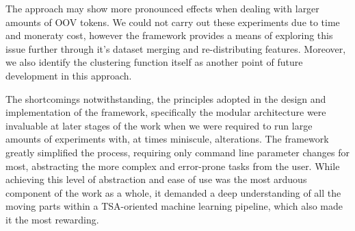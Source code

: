 \documentclass[../../fyp.tex]{subfiles}
\begin{document}
The approach may show more pronounced effects when dealing with larger amounts of OOV tokens. We could not carry out these experiments due to time and moneraty cost, however the framework provides a means of exploring this issue further through it's dataset merging and re-distributing features. Moreover, we also identify the clustering function itself as another point of future development in this approach. 

The shortcomings notwithstanding, the principles adopted in the design and implementation of the framework, specifically the modular architecture were invaluable at later stages of the work when we were required to run large amounts of experiments with, at times miniscule, alterations. The framework greatly simplified the process, requiring only command line parameter changes for most, abstracting the more complex and error-prone tasks from the user. While achieving this level of abstraction and ease of use was the most arduous component of the work as a whole, it demanded a deep understanding of all the moving parts within a TSA-oriented machine learning pipeline, which also made it the most rewarding.
\end{document}
